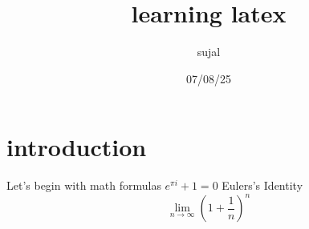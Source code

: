 \documentclass{article}
\title{learning latex}
\author{sujal}
\date{07/08/25}
\begin{document}
\section{introduction}
Let's begin with math formulas 
$e^{\pi i}+ 1 = 0$ Eulers's Identity
$$ \lim_{n\to\infty}\left(1+\frac{1}{n}\right)^n$$
\end{document}
